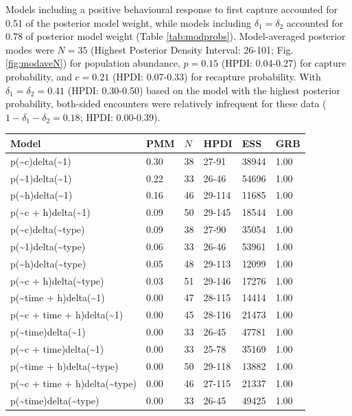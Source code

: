 \documentclass[12pt]{article}
\begin{document}
Models including a positive behavioural response to first capture accounted for 0.51 of the posterior model weight, while models including $\delta_1=\delta_2$ accounted for 0.78 of posterior model weight (Table \ref{tab:modprobs}). Model-averaged posterior modes were $N=35$ (Highest Posterior Density Interval: 26-101; Fig. \ref{fig:modaveN}) for population abundance, $p=0.15$ (HPDI: 0.04-0.27) for capture probability, and $c=0.21$ (HPDI: 0.07-0.33) for recapture probability. With $\delta_1=\delta_2=0.41$ (HPDI: 0.30-0.50) based on the model with the highest posterior probability, both-sided encounters were relatively infrequent for these data ($1-\delta_1-\delta_2=0.18$; HPDI: 0.00-0.39).
\begin{table}[ht]
\centering
\begin{tabular}{llllll}
  \hline
Model & PMM & $N$ & HPDI & ESS & GRB \\ 
  \hline
p(\~{}c)delta(\~{}1) & 0.30 & 38 & 27-91 & 38944 & 1.00 \\ 
  p(\~{}1)delta(\~{}1) & 0.22 & 33 & 26-46 & 54696 & 1.00 \\ 
  p(\~{}h)delta(\~{}1) & 0.16 & 46 & 29-114 & 11685 & 1.00 \\ 
  p(\~{}c + h)delta(\~{}1) & 0.09 & 50 & 29-145 & 18544 & 1.00 \\ 
  p(\~{}c)delta(\~{}type) & 0.09 & 38 & 27-90 & 35054 & 1.00 \\ 
  p(\~{}1)delta(\~{}type) & 0.06 & 33 & 26-46 & 53961 & 1.00 \\ 
  p(\~{}h)delta(\~{}type) & 0.05 & 48 & 29-113 & 12099 & 1.00 \\ 
  p(\~{}c + h)delta(\~{}type) & 0.03 & 51 & 29-146 & 17276 & 1.00 \\ 
  p(\~{}time + h)delta(\~{}1) & 0.00 & 47 & 28-115 & 14414 & 1.00 \\ 
  p(\~{}c + time + h)delta(\~{}1) & 0.00 & 45 & 28-116 & 21473 & 1.00 \\ 
  p(\~{}time)delta(\~{}1) & 0.00 & 33 & 26-45 & 47781 & 1.00 \\ 
  p(\~{}c + time)delta(\~{}1) & 0.00 & 33 & 25-78 & 35169 & 1.00 \\ 
  p(\~{}time + h)delta(\~{}type) & 0.00 & 50 & 29-118 & 13882 & 1.00 \\ 
  p(\~{}c + time + h)delta(\~{}type) & 0.00 & 46 & 27-115 & 21337 & 1.00 \\ 
  p(\~{}time)delta(\~{}type) & 0.00 & 33 & 26-45 & 49425 & 1.00 \\ 

\end{tabular}
\end{table}
\end{document}

